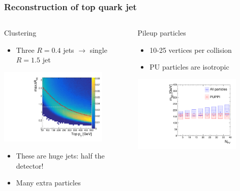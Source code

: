 \documentclass[aspectratio=169,xcolor=dvipsnames,,table,compress]{beamer}
\begin{document}
\begin{frame}[t]   \frametitle{Reconstruction of top quark jet}
  \vspace{-5mm}
  \begin{columns}[T]
  \begin{column}{0.33\textwidth}
  \centering 
    Clustering 
    \begin{itemize}
      \item {\small Three $R=0.4$ jets $\rightarrow$ single $R=1.5$ jet}
    \end{itemize}
      \includegraphics[width=0.8\textwidth]{../figures/toptagging/gen/ptdr.pdf}
      \vspace{-3mm}
    \begin{itemize}
      \item {\small These are huge jets: half the detector!}
      \item {\small Many extra particles}
    \end{itemize}
  \end{column}
  \pause 
  \begin{column}{0.33\textwidth}
  \centering 
    Pileup particles 
  \begin{itemize}
    \item {\small 10-25 vertices per collision}
    \item {\small PU particles are isotropic }
  \end{itemize}
      \includegraphics[width=0.8\textwidth]{../figures/toptagging/gen/npv_clf_MSD_ZpTT_lo.pdf}

\end{column}
\end{columns}
\end{frame}
\end{document}
